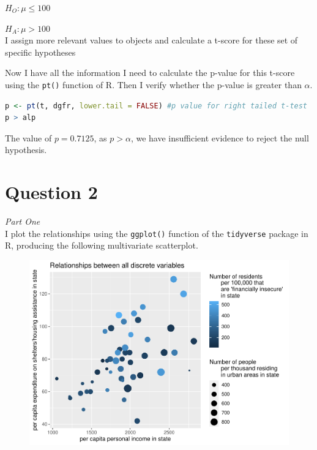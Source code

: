 \documentclass[12pt,letterpaper]{article}
\begin{document}
$H_{O}: \mu \leq 100$

$H_{A}: \mu > 100$\\

\noindent I assign more relevant values to objects and calculate a t-score for these set of specific hypotheses

 

\noindent Now I have all the information I need to calculate the p-value for this t-score using the \texttt{pt()} function of R. Then I verify whether the p-value is greater than $\alpha$.

\begin{lstlisting}[language=R]
p <- pt(t, dgfr, lower.tail = FALSE) #p value for right tailed t-test
p > alp
\end{lstlisting}

\noindent The value of $p = 0.7125$, as $p > \alpha$, we have insufficient evidence to reject the null hypothesis.


\clearpage

\section*{Question 2 }

\textit{Part One}\\ 

\noindent I plot the relationships using the \texttt{ggplot()} function of the \texttt{tidyverse} package in R, producing the following multivariate scatterplot.

\begin{figure}[h!]\centering
	\label{fig:plot_1}
	\includegraphics[width=.75\textwidth]{Plot 1.pdf}
\end{figure}
\end{document}
